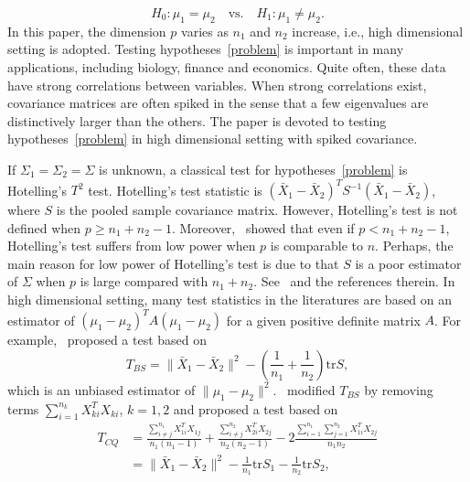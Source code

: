 \documentclass[review]{elsarticle}
\theoremstyle{plain}
\theoremstyle{definition}
\theoremstyle{remark}
\begin{document}
\begin{equation}\label{problem}
    H_0:\mu_1=\mu_2\quad \textrm{vs.}\quad H_1:\mu_1\neq \mu_2.
\end{equation}
In this paper, the dimension $p$ varies as $n_1$ and $n_2$ increase, i.e., high dimensional setting is adopted.
Testing hypotheses~\eqref{problem} is important in many applications, including biology, finance and economics. Quite often,  these data have strong correlations between variables. When strong correlations exist, covariance matrices are often spiked in the sense that a few eigenvalues are distinctively larger than the others. The paper is devoted to
testing hypotheses~\eqref{problem} in high dimensional setting with spiked covariance.


If $\Sigma_1=\Sigma_2=\Sigma$ is unknown, a classical test for hypotheses~\eqref{problem} is Hotelling's $T^2$ test.  Hotelling's test statistic is ${(\bar{X}_1-\bar{X}_2)}^T S^{-1}(\bar{X}_1-\bar{X}_2)$, where $S$ is the pooled sample covariance matrix. However, Hotelling's test is not defined when $p\geq n_1+n_2-1$.
Moreover,~\cite{Bai1996Efiect} showed that even if $p<n_1+n_2-1$, Hotelling's test suffers from low power when $p$ is comparable to $n$.
Perhaps, the main reason for low power of Hotelling's test is due to that $S$ is a poor estimator of $\Sigma$ when $p$ is large compared with $n_1+n_2$. See~\cite{Chen2010A} and the references therein.
In high dimensional setting,  
many test statistics in the literatures are based on an estimator of ${(\mu_1-\mu_2)}^T A(\mu_1-\mu_2)$ for a given positive definite matrix $A$. 
For example,~\cite{Bai1996Efiect} proposed a test based on
\begin{equation*}
    T_{BS}=\|\bar{X}_1-\bar{X}_2\|^2-(\frac{1}{n_1}+\frac{1}{n_2})\mathrm{tr}S,
\end{equation*}
which is an unbiased estimator of $\|\mu_1-\mu_2\|^2$.~\cite{Chen2010A} modified $T_{BS}$ by removing terms $\sum_{i=1}^{n_k}X_{ki}^T X_{ki}$, $k=1,2$ and proposed a test based on
\begin{equation*}
    \begin{aligned}
        T_{CQ}&=\frac{\sum_{i\neq j}^{n_1}X_{1i}^T X_{1j}}{n_1(n_1-1)}+\frac{\sum_{i\neq j}^{n_2}X_{2i}^T X_{2j}}{n_2(n_2-1)}-2\frac{\sum_{i=1}^{n_1}\sum_{j=1}^{n_2}X_{1i}^T X_{2j}}{n_1n_2}
        \\
            &=\|\bar{X}_1-\bar{X}_2\|^2-\frac{1}{n_1}\mathrm{tr}S_1-\frac{1}{n_2}\mathrm{tr}S_2,
    \end{aligned}
\end{equation*}
\end{document}
